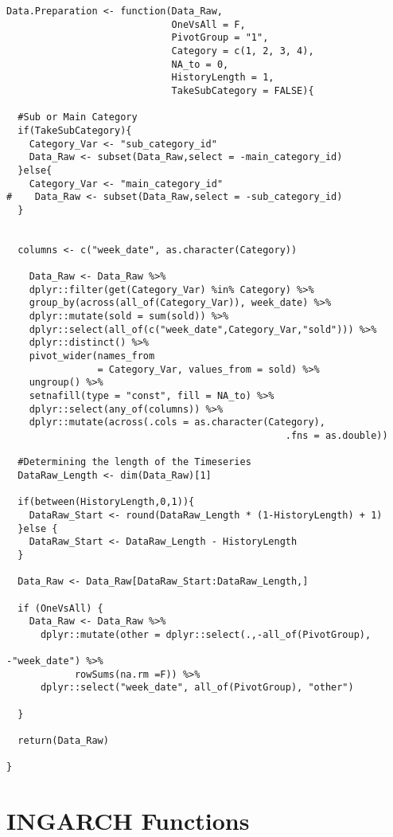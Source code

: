 \begin{verbatim}
Data.Preparation <- function(Data_Raw,
                             OneVsAll = F,
                             PivotGroup = "1",
                             Category = c(1, 2, 3, 4),
                             NA_to = 0,
                             HistoryLength = 1,
                             TakeSubCategory = FALSE){
  
  #Sub or Main Category
  if(TakeSubCategory){
    Category_Var <- "sub_category_id"
    Data_Raw <- subset(Data_Raw,select = -main_category_id)
  }else{
    Category_Var <- "main_category_id"
#    Data_Raw <- subset(Data_Raw,select = -sub_category_id)
  }

  
  columns <- c("week_date", as.character(Category))
  
    Data_Raw <- Data_Raw %>%
    dplyr::filter(get(Category_Var) %in% Category) %>%
    group_by(across(all_of(Category_Var)), week_date) %>%
    dplyr::mutate(sold = sum(sold)) %>% 
    dplyr::select(all_of(c("week_date",Category_Var,"sold"))) %>%
    dplyr::distinct() %>%
    pivot_wider(names_from
                = Category_Var, values_from = sold) %>%
    ungroup() %>%
    setnafill(type = "const", fill = NA_to) %>%
    dplyr::select(any_of(columns)) %>%
    dplyr::mutate(across(.cols = as.character(Category), 
												 .fns = as.double))
  
  #Determining the length of the Timeseries
  DataRaw_Length <- dim(Data_Raw)[1]
  
  if(between(HistoryLength,0,1)){
    DataRaw_Start <- round(DataRaw_Length * (1-HistoryLength) + 1)
  }else {
    DataRaw_Start <- DataRaw_Length - HistoryLength
  }
  
  Data_Raw <- Data_Raw[DataRaw_Start:DataRaw_Length,]
  
  if (OneVsAll) {
    Data_Raw <- Data_Raw %>%
      dplyr::mutate(other = dplyr::select(.,-all_of(PivotGroup), 
																					-"week_date") %>% 
			rowSums(na.rm =F)) %>%
      dplyr::select("week_date", all_of(PivotGroup), "other")
    
  }
  
  return(Data_Raw)
  
}
\end{verbatim}

\section{INGARCH Functions}
\label{sec:Ingarch Functions}

